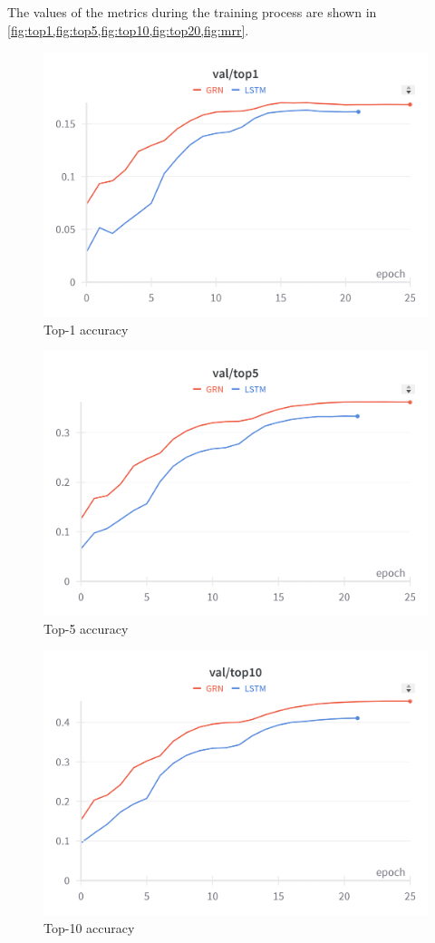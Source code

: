 \documentclass[twocolumn,twoside]{article}
\begin{document}
The values of the metrics during the training process are shown in 
\cref{fig:top1,fig:top5,fig:top10,fig:top20,fig:mrr}.
\begin{figure}[ht]
  \centering
  \includegraphics[width=\linewidth]{top1.png}
  \caption{Top-1 accuracy}
  \label{fig:top1}
\end{figure}
\begin{figure}[ht]
  \centering
  \includegraphics[width=\linewidth]{top5.png}
  \caption{Top-5 accuracy}
  \label{fig:top5}
\end{figure}
\begin{figure}[ht]
  \centering
  \includegraphics[width=\linewidth]{top10.png}
  \caption{Top-10 accuracy}
  \label{fig:top10}
\end{figure}
\end{document}

